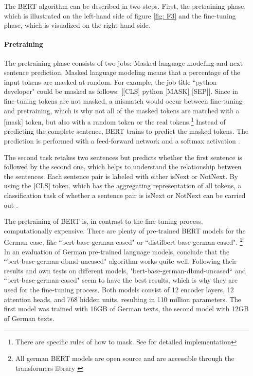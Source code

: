 \documentclass[12pt, a4paper, titlepage]{article}
\begin{document}
The \ac{BERT} algorithm can be described in two steps. First, the pretraining phase, which is illustrated on the left-hand side of figure \ref{fig: F3} and the fine-tuning phase, which is visualized on the right-hand side. 

\paragraph{Pretraining}
The pretraining phase consists of two jobs: Masked language modeling and next sentence prediction. Masked language modeling means that a percentage of the input tokens are masked at random. For example, the job title ``python developer" could be masked as follows: [[CLS] python [MASK] [SEP]]. Since in fine-tuning tokens are not masked, a mismatch would occur between fine-tuning and pretraining, which is why not all of the masked tokens are matched with a [mask] token, but also with a random token or the real tokens.\footnote{There are specific rules of how to mask. See \citet{devlin2018} for detailed implementation} Instead of predicting the complete sentence, \ac{BERT} trains to predict the masked tokens. The prediction is performed with a feed-forward network and a softmax activation \citep{devlin2018,ravichandiran2021}. 

The second task retakes two sentences but predicts whether the first sentence is followed by the second one, which helps to understand the relationship between the sentences. Each sentence pair is labeled with either isNext or NotNext. By using the [CLS] token, which has the aggregating representation of all tokens, a classification task of whether a sentence pair is isNext or NotNext can be carried out \citep{ravichandiran2021,devlin2018}.

The pretraining of \ac{BERT} is, in contrast to the fine-tuning process, computationally expensive. There are plenty of pre-trained \ac{BERT} models for the German case, like ``bert-base-german-cased" or ``distilbert-base-german-cased". \footnote{All german \ac{BERT} models are open source and are accessible through the transformers library \citep{wolf2020}} In an evaluation of German pre-trained language models, \citet{assenmacher2021} conclude that the ``bert-base-german-dbmd-uncased" algorithm works quite well. Following their results and own tests on different models, "bert-base-german-dbmd-uncased`` and ``bert-base-german-cased" seem to have the best results, which is why they are used for the fine-tuning process. Both models consist of 12 encoder layers, 12 attention heads, and 768 hidden units, resulting in 110 million parameters. The first model was trained with 16GB of German texts, the second model with 12GB of German texts. 
\end{document}
